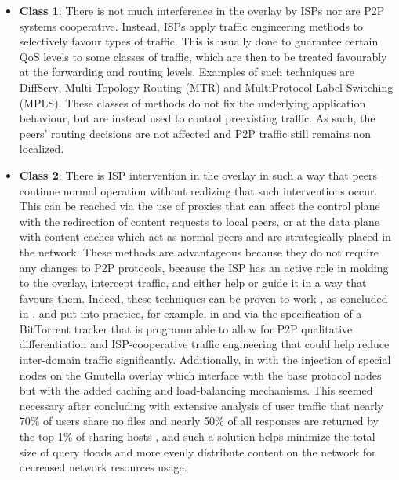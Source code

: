     \begin{itemize}
        \item \textbf{Class 1}:
            There is not much interference in the overlay by ISPs nor are P2P systems cooperative.
            Instead, ISPs apply traffic engineering methods to selectively favour types of traffic.
            This is usually done to guarantee certain QoS levels to some classes of traffic, which are then to be treated favourably at the forwarding and routing levels.
            Examples of such techniques are DiffServ, Multi-Topology Routing (MTR) and MultiProtocol Label Switching (MPLS).
            These classes of methods do not fix the underlying application behaviour, but are instead used to control preexisting traffic.
            As such, the peers' routing decisions are not affected and P2P traffic still remains non localized.
        \item \textbf{Class 2}:
            There is ISP intervention in the overlay in such a way that peers continue normal operation without realizing that such interventions occur.
            This can be reached via the use of proxies that can affect the control plane with the redirection of content requests to local peers, or at the data plane with content caches which act as normal peers and are strategically placed in the network.
            These methods are advantageous because they do not require any changes to P2P protocols, because the ISP has an active role in molding to the overlay, intercept traffic, and either help or guide it in a way that favours them.
            Indeed, these techniques can be proven to work , as concluded in \cite{dan-Commag10}, and put into practice, for example, in \cite{programmable-trackers} and \cite{configurable-trackers} via the specification of a BitTorrent tracker that is programmable to allow for P2P qualitative differentiation and ISP-cooperative traffic engineering that could help reduce inter-domain traffic significantly.
            Additionally, in \cite{freeriding-gnutella} with the injection of special nodes on the Gnutella overlay which interface with the base protocol nodes but with the added caching and load-balancing mechanisms.
            This seemed necessary after concluding with extensive analysis of user traffic that nearly 70\% of users share no files and nearly 50\% of all responses are returned by the top 1\% of sharing hosts \cite{freeriding-gnutella}, and such a solution  helps minimize the total size of query floods and more evenly distribute content on the network for decreased network resources usage.

\end{itemize}
